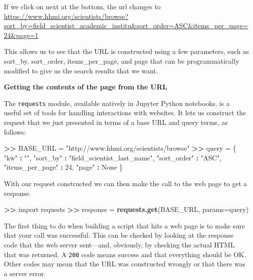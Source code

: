 \documentclass[]{krantz}
\newenvironment{Shaded}{\begin{snugshade}}{\end{snugshade}}
\newcommand{\KeywordTok}[1]{\textcolor[rgb]{0.13,0.29,0.53}{\textbf{#1}}}
\newcommand{\DataTypeTok}[1]{\textcolor[rgb]{0.13,0.29,0.53}{#1}}
\newcommand{\DecValTok}[1]{\textcolor[rgb]{0.00,0.00,0.81}{#1}}
\newcommand{\StringTok}[1]{\textcolor[rgb]{0.31,0.60,0.02}{#1}}
\newcommand{\OperatorTok}[1]{\textcolor[rgb]{0.81,0.36,0.00}{\textbf{#1}}}
\newcommand{\ErrorTok}[1]{\textcolor[rgb]{0.64,0.00,0.00}{\textbf{#1}}}
\newcommand{\NormalTok}[1]{#1}
\begin{document}
If we click on next at the bottom, the url changes to
\url{https://www.hhmi.org/scientists/browse?sort_by=field_scientist_academic_institu\&sort_order=ASC\&items_per_page=24\&page=1}

This allows us to see that the URL is constructed using a few
parameters, such as sort\_by, sort\_order, items\_per\_page, and page
that can be programmatically modified to give us the search results that
we want.

\textbf{Getting the contents of the page from the URL}

The \texttt{requests} module, available natively in Jupyter Python
notebooks, is a useful set of tools for handling interactions with
websites. It lets us construct the request that we just presented in
terms of a base URL and query terms, as follows:

\begin{Shaded}
\begin{Highlighting}[]
\OperatorTok{>}\ErrorTok{>}\StringTok{ }\NormalTok{BASE_URL =}\StringTok{ "http://www.hhmi.org/scientists/browse"}
\OperatorTok{>}\ErrorTok{>}\StringTok{ }\NormalTok{query =}\StringTok{ }\NormalTok{\{}
            \StringTok{"kw"} \OperatorTok{:}\StringTok{ ""}\NormalTok{,}
            \StringTok{"sort_by"} \OperatorTok{:}\StringTok{ "field_scientist_last_name"}\NormalTok{,}
            \StringTok{"sort_order"} \OperatorTok{:}\StringTok{ "ASC"}\NormalTok{,}
            \StringTok{"items_per_page"} \OperatorTok{:}\StringTok{ }\DecValTok{24}\NormalTok{,}
            \StringTok{"page"} \OperatorTok{:}\StringTok{ }\NormalTok{None}
\NormalTok{           \}}
\end{Highlighting}
\end{Shaded}

With our request constructed we can then make the call to the web page
to get a response.

\begin{Shaded}
\begin{Highlighting}[]
\OperatorTok{>}\ErrorTok{>}\StringTok{ }\NormalTok{import requests}
\OperatorTok{>}\ErrorTok{>}\StringTok{ }\NormalTok{response =}\StringTok{ }\KeywordTok{requests.get}\NormalTok{(BASE_URL, }\DataTypeTok{params=}\NormalTok{query)}
\end{Highlighting}
\end{Shaded}

The first thing to do when building a script that hits a web page is to
make sure that your call was successful. This can be checked by looking
at the response code that the web server sent---and, obviously, by
checking the actual HTML that was returned. A \texttt{200} code means
success and that everything should be OK. Other codes may mean that the
URL was constructed wrongly or that there was a server error.
\end{document}
